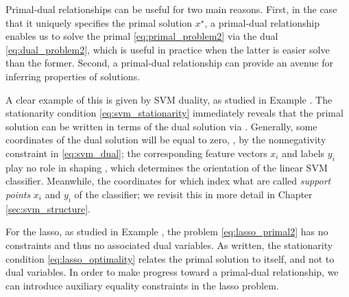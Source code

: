 Primal-dual relationships can be useful for two main reasons. First, in the case
that it uniquely specifies the primal solution $x^\star$, a primal-dual
relationship enables us to solve the primal \eqref{eq:primal_problem2} via the
dual \eqref{eq:dual_problem2}, which is useful in practice when the latter is
easier solve than the former. Second, a primal-dual relationship can provide an
avenue for inferring properties of solutions.

A clear example of this is given by SVM duality, as studied in Example
. The stationarity condition \eqref{eq:svm_stationarity}
immediately reveals that the primal solution \smash{$\hbeta$} can be written in
terms of the dual solution via . Generally, some coordinates of the dual solution will be equal to
zero, , by the nonnegativity constraint in
\eqref{eq:svm_dual}; the corresponding feature vectors $x_i$ and labels $y_i$
play no role in shaping \smash{$\hbeta$}, which determines the orientation of
the linear SVM classifier. Meanwhile, the coordinates for which
 index what are called \emph{support points} $x_i$
and $y_i$ of the classifier; we revisit this in more detail in Chapter
\ref{sec:svm_structure}.      

For the lasso, as studied in Example , the problem
\eqref{eq:lasso_primal2} has no constraints and thus no associated dual   
variables. As written, the stationarity condition \eqref{eq:lasso_optimality}
relates the primal solution to itself, and not to dual variables. In order to
make progress toward a primal-dual relationship, we can introduce auxiliary
equality constraints in the lasso problem.

